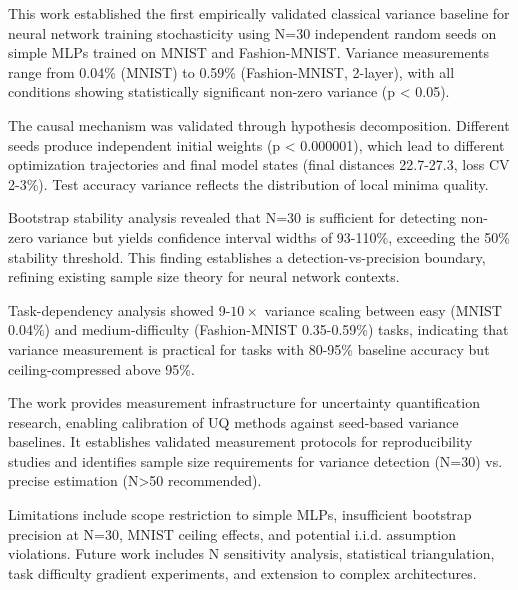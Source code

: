 
This work established the first empirically validated classical variance baseline for neural network training stochasticity using N=30 independent random seeds on simple MLPs trained on MNIST and Fashion-MNIST. Variance measurements range from 0.04\% (MNIST) to 0.59\% (Fashion-MNIST, 2-layer), with all conditions showing statistically significant non-zero variance (p < 0.05).

The causal mechanism was validated through hypothesis decomposition. Different seeds produce independent initial weights (p < 0.000001), which lead to different optimization trajectories and final model states (final distances 22.7-27.3, loss CV 2-3\%). Test accuracy variance reflects the distribution of local minima quality.

Bootstrap stability analysis revealed that N=30 is sufficient for detecting non-zero variance but yields confidence interval widths of 93-110\%, exceeding the 50\% stability threshold. This finding establishes a detection-vs-precision boundary, refining existing sample size theory for neural network contexts.

Task-dependency analysis showed 9-$10\times$ variance scaling between easy (MNIST 0.04\%) and medium-difficulty (Fashion-MNIST 0.35-0.59\%) tasks, indicating that variance measurement is practical for tasks with 80-95\% baseline accuracy but ceiling-compressed above 95\%.

The work provides measurement infrastructure for uncertainty quantification research, enabling calibration of UQ methods against seed-based variance baselines. It establishes validated measurement protocols for reproducibility studies and identifies sample size requirements for variance detection (N=30) vs. precise estimation (N>50 recommended).

Limitations include scope restriction to simple MLPs, insufficient bootstrap precision at N=30, MNIST ceiling effects, and potential i.i.d. assumption violations. Future work includes N sensitivity analysis, statistical triangulation, task difficulty gradient experiments, and extension to complex architectures.
